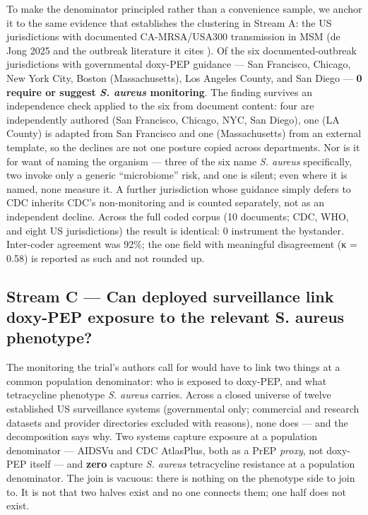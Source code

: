 \documentclass[10pt,letterpaper]{article}
\begin{document}
To make the denominator principled rather than a convenience sample, we
anchor it to the same evidence that establishes the clustering in Stream
A: the US jurisdictions with documented CA-MRSA/USA300 transmission in
MSM (de Jong 2025 and the outbreak literature it cites
\cite{dejong2025, diep2008}). Of the six documented-outbreak
jurisdictions with governmental doxy-PEP guidance --- San Francisco,
Chicago, New York City, Boston (Massachusetts), Los Angeles County, and
San Diego --- \textbf{0 require or suggest \emph{S. aureus} monitoring}.
The finding survives an independence check applied to the six from
document content: four are independently authored (San Francisco,
Chicago, NYC, San Diego), one (LA County) is adapted from San Francisco
and one (Massachusetts) from an external template, so the declines are
not one posture copied across departments. Nor is it for want of naming
the organism --- three of the six name \emph{S. aureus} specifically,
two invoke only a generic ``microbiome'' risk, and one is silent; even
where it is named, none measure it. A further jurisdiction whose
guidance simply defers to CDC inherits CDC's non-monitoring and is
counted separately, not as an independent decline. Across the full coded
corpus (10 documents; CDC, WHO, and eight US jurisdictions) the result
is identical: 0 instrument the bystander. Inter-coder agreement was
92\%; the one field with meaningful disagreement (κ = 0.58) is reported
as such and not rounded up.

\subsection*{Stream C --- Can deployed surveillance link doxy-PEP exposure to the relevant S. aureus phenotype?}

The monitoring the trial's authors call for would have to link two
things at a common population denominator: who is exposed to doxy-PEP,
and what tetracycline phenotype \emph{S. aureus} carries. Across a
closed universe of twelve established US surveillance systems
(governmental only; commercial and research datasets and provider
directories excluded with reasons), none does --- and the decomposition
says why. Two systems capture exposure at a population denominator ---
AIDSVu and CDC AtlasPlus, both as a PrEP \emph{proxy}, not doxy-PEP
itself \cite{aidsvu} --- and \textbf{zero} capture \emph{S. aureus}
tetracycline resistance at a population denominator. The join is
vacuous: there is nothing on the phenotype side to join to. It is not
that two halves exist and no one connects them; one half does not exist.
\end{document}
